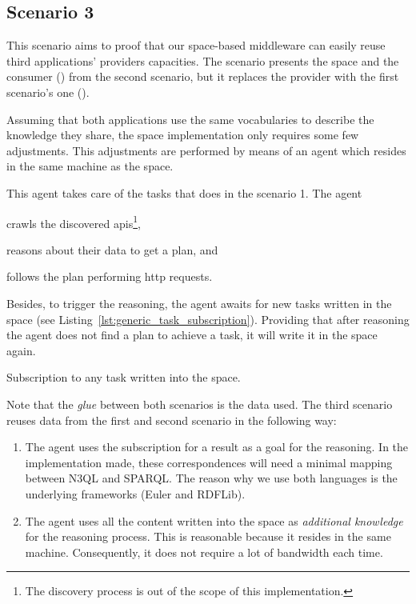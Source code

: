 \subsection{Scenario 3}
\label{sec:actuation_scn3}

This scenario aims to proof that our space-based middleware can easily reuse third applications' providers capacities. %
The scenario presents the space and the consumer (\consd{}) from the second scenario, but it replaces the provider with the first scenario's one (\prova{}).


Assuming that both applications use the same vocabularies to describe the knowledge they share,
the space implementation only requires some few adjustments.
This adjustments are performed by means of an agent which resides in the same machine as the space.


This agent takes care of the tasks that \consc{} does in the scenario 1.
The agent
\begin{enumerate*}[label=\itshape(\arabic*\upshape)]
  \item crawls the discovered \acsp{api}\footnote{The discovery process is out of the scope of this implementation.},
  \item reasons about their data to get a plan, and
  \item follows the plan performing \acs{http} requests.
\end{enumerate*}
Besides, to trigger the reasoning, the agent awaits for new tasks written in the space (see Listing~\ref{lst:generic_task_subscription}).
Providing that after reasoning the agent does not find a plan to achieve a task, it will write it in the space again. %

\begin{listing}
  
  \caption{Subscription to any task written into the space.}
  \label{lst:generic_task_subscription}
\end{listing}


Note that the \emph{glue} between both scenarios is the data used.
The third scenario reuses data from the first and second scenario in the following way:
\begin{enumerate}
  \item The agent uses the \consd{} subscription for a result as a goal for the reasoning.
	In the implementation made, these correspondences will need a minimal mapping between N3QL and SPARQL.
	The reason why we use both languages is the underlying frameworks (Euler and RDFLib). %
  \item The agent uses all the content written into the space as \emph{additional knowledge} for the reasoning process.
	This is reasonable because it resides in the same machine.
	Consequently, it does not require a lot of bandwidth each time.
\end{enumerate}


